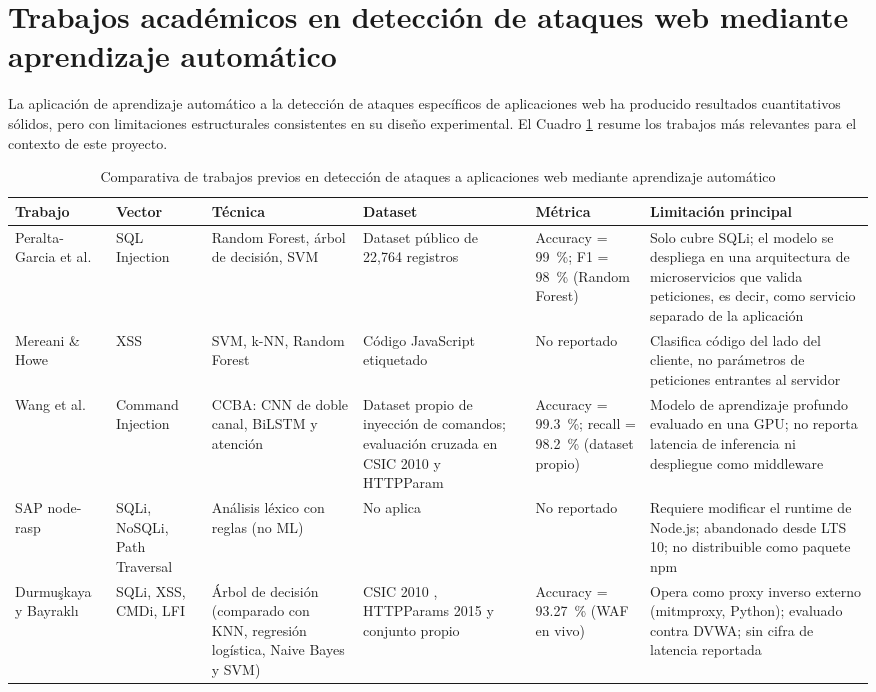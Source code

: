 \section{Trabajos académicos en detección de ataques web mediante aprendizaje automático}
La aplicación de aprendizaje automático a la detección de ataques específicos de aplicaciones web
ha producido resultados cuantitativos sólidos, pero con limitaciones estructurales consistentes en
su diseño experimental. El Cuadro \ref{cuadro:trabajosprevios} resume los trabajos más
relevantes para el contexto de este proyecto.

\begin{table}[h]
\small
\begin{tabular}{|p{2.1cm}|p{1.6cm}|p{2.2cm}|p{1.6cm}|p{1.6cm}|p{3.3cm}|}
\hline
\textbf{Trabajo} & \textbf{Vector} & \textbf{Técnica} & \textbf{Dataset} & \textbf{Métrica} & \textbf{Limitación principal} \\ \hline
Peralta-Garcia et al. \cite{peralta2024sql} & SQL Injection & Random Forest, árbol de decisión, SVM & Dataset público de 22{,}764 registros & Accuracy = 99~\%; F1 = 98~\% (Random Forest) & Solo cubre SQLi; el modelo se despliega en una arquitectura de microservicios que valida peticiones, es decir, como servicio separado de la aplicación \\ \hline
Mereani \& Howe \cite{mereani2019} & XSS & SVM, k-NN, Random Forest & Código JavaScript etiquetado & No reportado & Clasifica código del lado del cliente, no parámetros de peticiones entrantes al servidor \\ \hline
Wang et al. \cite{seyyar2024} & Command Injection & CCBA: CNN de doble canal, BiLSTM y atención & Dataset propio de inyección de comandos; evaluación cruzada en CSIC 2010 \cite{torrano2010csic} y HTTPParam & Accuracy = 99.3~\%; recall = 98.2~\% (dataset propio) & Modelo de aprendizaje profundo evaluado en una GPU; no reporta latencia de inferencia ni despliegue como middleware \\ \hline
SAP node-rasp \cite{saparchive2019} & SQLi, NoSQLi, Path Traversal & Análisis léxico con reglas (no ML) & No aplica & No reportado & Requiere modificar el runtime de Node.js; abandonado desde LTS 10; no distribuible como paquete npm \\ \hline
Durmuşkaya y Bayraklı \cite{durmuskaya2025waf} & SQLi, XSS, CMDi, LFI & Árbol de decisión (comparado con KNN, regresión logística, Naive Bayes y SVM) & CSIC 2010 \cite{torrano2010csic}, HTTPParams 2015 y conjunto propio & Accuracy = 93.27~\% (WAF en vivo) & Opera como proxy inverso externo (mitmproxy, Python); evaluado contra DVWA; sin cifra de latencia reportada \\ \hline
\end{tabular}
\caption[Comparativa de trabajos previos en detección de ataques web con ML]{Comparativa de trabajos previos en detección de ataques a aplicaciones web mediante aprendizaje automático}
\label{cuadro:trabajosprevios}
\end{table}
